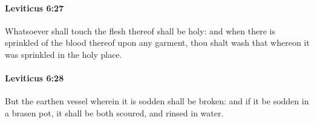 		\paragraph{Leviticus 6:27} %
			\label{LEVITICUS-6-27}

			Whatsoever shall touch the flesh thereof shall be holy: and when there is sprinkled of the blood thereof upon any garment, thou shalt wash that whereon it was sprinkled in the holy place.


		\paragraph{Leviticus 6:28} %
			\label{LEVITICUS-6-28}

			But the earthen vessel wherein it is sodden shall be broken: and if it be sodden in a brasen pot, it shall be both scoured, and rinsed in water.


